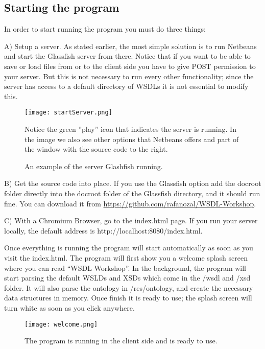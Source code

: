 \documentclass[a4paper,10pt]{article}
\begin{document}
  \subsection{Starting the program}

	In order to start running the program you must do three things:\vspace{3 mm}

	A) Setup a server. As stated earlier, the most simple solution is to run Netbeans and start the Glassfish server from there. Notice that if you want to be able to save or load files from or to the client side you have to give POST permission to your server. But this is not necessary to run every other functionality; since the server has access to a default directory of WSDLs it is not essential to modify this.

	\begin{figure}[H]
	  {\centering  
	  \texttt{[image: startServer.png]}
	  \caption{An example of the server Glashfish running.}}
	  \medskip
	  \small
	  Notice the green ''play'' icon that indicates the server is running. In the image we also see other options that Netbeans offers and part of the window with the source code to the right.
	\end{figure}

	B) Get the source code into place. If you use the Glassfish option add the docroot folder directly into the docroot folder of the Glassfish directory, and it should run fine. You can download it from \url{ https://github.com/rafanozal/WSDL-Workshop}.\vspace{3 mm}

	C) With a Chromium Browser, go to the index.html page. If you run your server locally, the default address is http://localhost:8080/index.html.\vspace{3 mm}

	Once everything is running the program will start automatically as soon as you visit the index.html. The program will first show you a welcome splash screen where you can read “WSDL Workshop”. In the background, the program will start parsing the default WSLDs and XSDs which come in the /wsdl and /xsd folder. It will also parse the ontology in /res/ontology, and create the necessary data structures in memory. Once finish it is ready to use; the splash screen will turn white as soon as you click anywhere.

	\begin{figure}[H]
	  \centering  
	  \texttt{[image: welcome.png]}
	  \caption{The program is running in the client side and is ready to use.}
	\end{figure}
\end{document}
